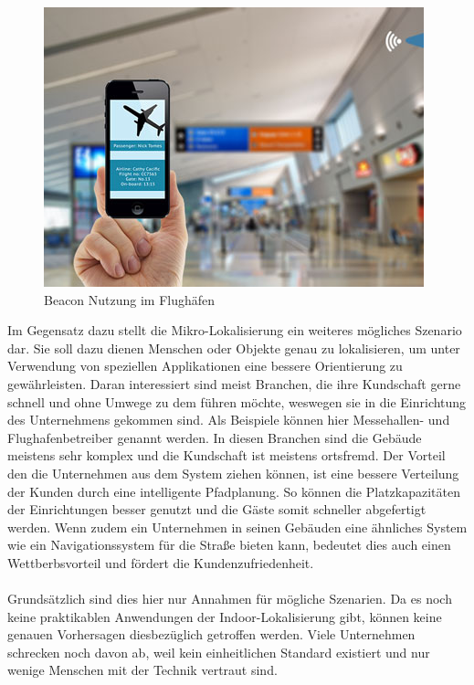\newpage
\begin{figure} 
\centering
\includegraphics[scale=0.5]{Bilder/iBeaconAirport}
\caption{Beacon Nutzung im Flughäfen \cite{Airpo}}
\label{Nr5}
\end{figure}
Im Gegensatz dazu stellt die Mikro-Lokalisierung ein weiteres mögliches Szenario dar. Sie soll dazu dienen Menschen oder Objekte genau zu lokalisieren, um unter Verwendung von speziellen Applikationen eine bessere Orientierung zu gewährleisten. Daran interessiert sind meist Branchen, die ihre Kundschaft gerne schnell und ohne Umwege zu dem führen möchte, weswegen sie in die Einrichtung des Unternehmens gekommen sind. Als Beispiele können hier Messehallen- und Flughafenbetreiber genannt werden. In diesen Branchen sind die Gebäude meistens sehr komplex und die Kundschaft ist meistens ortsfremd. Der Vorteil den die Unternehmen aus dem System ziehen können, ist eine bessere Verteilung der Kunden durch eine intelligente Pfadplanung. So können die Platzkapazitäten der Einrichtungen besser genutzt und die Gäste somit schneller abgefertigt werden. Wenn zudem ein Unternehmen in seinen Gebäuden eine ähnliches System wie ein Navigationssystem für die Straße bieten kann, bedeutet dies auch einen Wettberbsvorteil und fördert die Kundenzufriedenheit. \\ \\
Grundsätzlich sind dies hier nur Annahmen für mögliche Szenarien. Da es noch keine praktikablen Anwendungen der Indoor-Lokalisierung gibt, können keine genauen Vorhersagen diesbezüglich getroffen werden. Viele Unternehmen schrecken noch davon ab, weil kein einheitlichen Standard existiert und nur wenige Menschen mit der Technik vertraut sind.  
